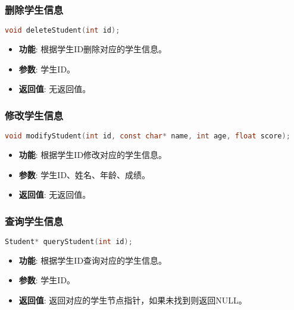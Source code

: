 \subsubsection{删除学生信息}
\begin{lstlisting}[language=C, caption=删除学生信息函数]
void deleteStudent(int id);
\end{lstlisting}
\begin{itemize}
    \item \textbf{\textcolor{mydeepgreen}{功能}}: 根据学生ID删除对应的学生信息。
    \item \textbf{\textcolor{mydeepgreen}{参数}}: 学生ID。
    \item \textbf{\textcolor{mydeepgreen}{返回值}}: 无返回值。
\end{itemize}

\subsubsection{修改学生信息}
\begin{lstlisting}[language=C, caption=修改学生信息函数]
void modifyStudent(int id, const char* name, int age, float score);
\end{lstlisting}
\begin{itemize}
    \item \textbf{\textcolor{mydeepgreen}{功能}}: 根据学生ID修改对应的学生信息。
    \item \textbf{\textcolor{mydeepgreen}{参数}}: 学生ID、姓名、年龄、成绩。
    \item \textbf{\textcolor{mydeepgreen}{返回值}}: 无返回值。
\end{itemize}

\subsubsection{查询学生信息}
\begin{lstlisting}[language=C, caption=查询学生信息函数]
Student* queryStudent(int id);
\end{lstlisting}
\begin{itemize}
    \item \textbf{\textcolor{mydeepgreen}{功能}}: 根据学生ID查询对应的学生信息。
    \item \textbf{\textcolor{mydeepgreen}{参数}}: 学生ID。
    \item \textbf{\textcolor{mydeepgreen}{返回值}}: 返回对应的学生节点指针，如果未找到则返回NULL。
\end{itemize}

